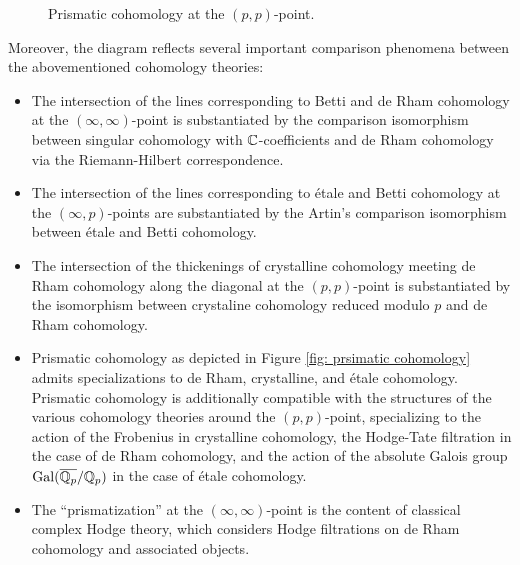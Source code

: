 \begin{figure}[H]
\begin{center}
    \end{center}
    \caption{Prismatic cohomology at the $(p,p)$-point.}
\end{figure}
Moreover, the diagram reflects several important comparison phenomena between the abovementioned cohomology theories:
\begin{itemize}
    \item The intersection of the lines corresponding to Betti and de Rham cohomology at the $(\infty,\infty)$-point is substantiated by the comparison isomorphism between singular cohomology with $\mathbb{C}$-coefficients and de Rham cohomology via the Riemann-Hilbert correspondence. 
    \item The intersection of the lines corresponding to \'{e}tale and Betti cohomology at the $(\infty,p)$-points are substantiated by the Artin's comparison isomorphism between \'{e}tale and Betti cohomology. 
    \item The intersection of the thickenings of crystalline cohomology meeting de Rham cohomology along the diagonal at the $(p,p)$-point is substantiated by the isomorphism between crystaline cohomology reduced modulo $p$ and de Rham cohomology.
    \item Prismatic cohomology as depicted in Figure \ref{fig: prsimatic cohomology} admits specializations to de Rham, crystalline, and \'{e}tale cohomology. Prismatic cohomology is additionally compatible with the structures of the various cohomology theories around the $(p,p)$-point, specializing to the action of the Frobenius in crystalline cohomology, the Hodge-Tate filtration in the case of de Rham cohomology, and the action of the absolute Galois group $\mathrm{Gal}(\overline{\mathbb{Q}_{p}}/\mathbb{Q}_{p})$ in the case of \'{e}tale cohomology.  
    \item The ``prismatization'' at the $(\infty,\infty)$-point is the content of classical complex Hodge theory, which considers Hodge filtrations on de Rham cohomology and associated objects. 
\end{itemize}
